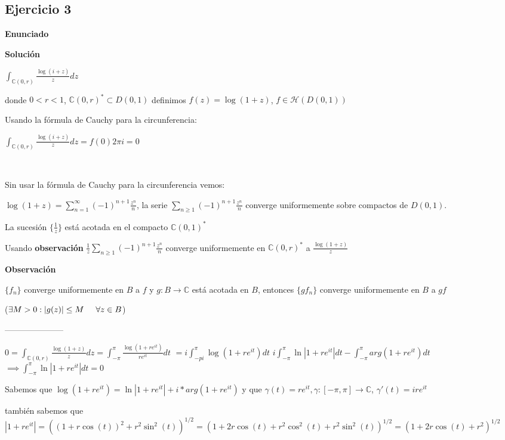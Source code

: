 \subsection{Ejercicio 3}
\textbf{Enunciado}

\textbf{Solución}

$\int_{\mathbb{C}(0,r)} \frac{\log(i+z)}{z} dz$

donde $0<r<1$, $\mathbb{C}(0,r)^{\ast} \subset D(0,1)$ definimos $f(z) = \log(1+z)$, $f\in\mathcal{H}(D(0,1))$

Usando la fórmula de Cauchy para la circunferencia:

$\int_{\mathbb{C}(0,r)} \frac{\log(i+z)}{z} dz = f(0)2\pi i = 0$

\

Sin usar la fórmula de Cauchy para la circunferencia vemos:

$\log (1+z) = \sum_{n=1}^{\infty} (-1)^{n+1} \frac{z^n}{n}$,
la serie $\sum_{n\geq 1} (-1)^{n+1} \frac{z^n}{n}$ converge uniformemente sobre compactos de $D(0,1)$.

La sucesión $\{ \frac{1}{z} \}$ está acotada en el compacto $\mathbb{C}(0,1)^{\ast}$ 

Usando \textbf{observación} 
$\frac{1}{z} \sum_{n\geq 1} (-1)^{n+1} \frac{z^n}{n}$ converge uniformemente en $\mathbb{C}(0,r)^{\ast}$ a $\frac{\log (1+z)}{z}$

\textbf{Observación}

$\{ f_n \} $ converge uniformemente en $B$ a $f$  
y $g:B\rightarrow\mathbb{C}$ está acotada en $B$, entonces
$\{ gf_n \}$ converge uniformemente en $B$ a $gf$

($\exists M>0 : |g(z)| \leq M \hspace{0.5cm} \forall z\in B  $)


---------------------

$0 = \int_{\mathbb{C}(0,r)} \frac{\log(1+z)}{z} dz = \int_{-\pi}^{\pi}  \frac{\log(1+re^{it})}{re^{it}} dt$
$= i\int_{-pi}^{\pi} \log(1+re^{it}) dt$
$i\int_{-\pi}^{\pi} \ln|1+re^{it}|dt -\int_{-\pi}^{\pi} arg(1+re^{it})dt$
$\implies \int_{-\pi}^{\pi} \ln |1+re^{it}|dt = 0$

Sabemos que $\log(1+re^{it}) = \ln|1+re^{it}| + i*arg(1+re^{it})$
y que
$\gamma(t) = re^{it}, \gamma:[-\pi,\pi] \rightarrow \mathbb{C}$, $\gamma '(t) = ire^{it}$


también sabemos que
$|1+re^{it}| = ((1+r\cos(t))^2 + r^2\sin^2(t))^{1/2} = (1+2r\cos(t) + r^2\cos^2(t) + r^2\sin^2(t))^{1/2} = (1+2r\cos(t)+r^2)^{1/2}$


